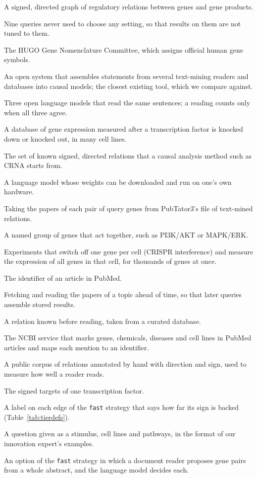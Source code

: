 \documentclass[11pt,a4paper]{article}
\newcommand{\code}[1]{\texttt{#1}}
\begin{document}
\begin{description}[leftmargin=0.6cm, itemsep=0.2em]
  \item[Gene regulatory network] A signed, directed graph of regulatory relations between genes and gene products.
  \item[Held-out queries] Nine queries never used to choose any setting, so that results on them are not tuned to them.
  \item[HGNC] The HUGO Gene Nomenclature Committee, which assigns official human gene symbols.
  \item[INDRA] An open system that assembles statements from several text-mining readers and databases into causal models; the closest existing tool, which we compare against.
  \item[Jury] Three open language models that read the same sentences; a reading counts only when all three agree.
  \item[KnockTF] A database of gene expression measured after a transcription factor is knocked down or knocked out, in many cell lines.
  \item[Knowledge base] The set of known signed, directed relations that a causal analysis method such as CRNA starts from.
  \item[Open-weight model] A language model whose weights can be downloaded and run on one's own hardware.
  \item[Pair retrieval] Taking the papers of each pair of query genes from PubTator3's file of text-mined relations.
  \item[Pathway] A named group of genes that act together, such as PI3K/AKT or MAPK/ERK.
  \item[Perturb-seq, CRISPRi] Experiments that switch off one gene per cell (CRISPR interference) and measure the expression of all genes in that cell, for thousands of genes at once.
  \item[PMID] The identifier of an article in PubMed.
  \item[Preparation] Fetching and reading the papers of a topic ahead of time, so that later queries assemble stored results.
  \item[Prior] A relation known before reading, taken from a curated database.
  \item[PubTator3] The NCBI service that marks genes, chemicals, diseases and cell lines in PubMed articles and maps each mention to an identifier.
  \item[RegulaTome] A public corpus of relations annotated by hand with direction and sign, used to measure how well a reader reads.
  \item[Regulon] The signed targets of one transcription factor.
  \item[Tier] A label on each edge of the \code{fast} strategy that says how far its sign is backed (Table~\ref{tab:tierdefs}).
  \item[Topic query] A question given as a stimulus, cell lines and pathways, in the format of our innovation expert's examples.
  \item[Wide mode] An option of the \code{fast} strategy in which a document reader proposes gene pairs from a whole abstract, and the language model decides each.
\end{description}
\clearpage
\end{document}
